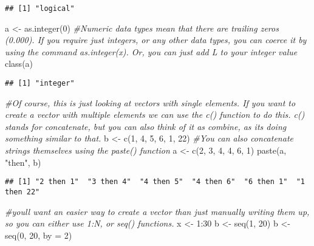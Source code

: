 \documentclass[
]{article}
\newenvironment{Shaded}{\begin{snugshade}}{\end{snugshade}}
\newcommand{\AttributeTok}[1]{\textcolor[rgb]{0.77,0.63,0.00}{#1}}
\newcommand{\CommentTok}[1]{\textcolor[rgb]{0.56,0.35,0.01}{\textit{#1}}}
\newcommand{\DecValTok}[1]{\textcolor[rgb]{0.00,0.00,0.81}{#1}}
\newcommand{\FunctionTok}[1]{\textcolor[rgb]{0.00,0.00,0.00}{#1}}
\newcommand{\NormalTok}[1]{#1}
\newcommand{\OtherTok}[1]{\textcolor[rgb]{0.56,0.35,0.01}{#1}}
\newcommand{\SpecialCharTok}[1]{\textcolor[rgb]{0.00,0.00,0.00}{#1}}
\newcommand{\StringTok}[1]{\textcolor[rgb]{0.31,0.60,0.02}{#1}}
\begin{document}
\begin{verbatim}
## [1] "logical"
\end{verbatim}

\begin{Shaded}
\begin{Highlighting}[]
\NormalTok{a }\OtherTok{\textless{}{-}} \FunctionTok{as.integer}\NormalTok{(}\DecValTok{0}\NormalTok{) }\CommentTok{\#Numeric data types mean that there are trailing zeros (0.000). If you require just integers, or any other data types, you can coerce it by using the command as.integer(x). Or, you can just add L to your integer value}
\FunctionTok{class}\NormalTok{(a)}
\end{Highlighting}
\end{Shaded}

\begin{verbatim}
## [1] "integer"
\end{verbatim}

\begin{Shaded}
\begin{Highlighting}[]
\CommentTok{\#Of course, this is just looking at vectors with single elements. If you want to create a vector with multiple elements we can use the c() function to do this. c() stands for concatenate, but you can also think of it as combine, as it\textquotesingle{}s doing something similar to that.}
\NormalTok{b }\OtherTok{\textless{}{-}} \FunctionTok{c}\NormalTok{(}\DecValTok{1}\NormalTok{, }\DecValTok{4}\NormalTok{, }\DecValTok{5}\NormalTok{, }\DecValTok{6}\NormalTok{, }\DecValTok{1}\NormalTok{, }\DecValTok{22}\NormalTok{)}
\CommentTok{\#You can also concatenate strings themselves using the paste() function}
\NormalTok{a }\OtherTok{\textless{}{-}} \FunctionTok{c}\NormalTok{(}\DecValTok{2}\NormalTok{, }\DecValTok{3}\NormalTok{, }\DecValTok{4}\NormalTok{, }\DecValTok{4}\NormalTok{, }\DecValTok{6}\NormalTok{, }\DecValTok{1}\NormalTok{)}
\FunctionTok{paste}\NormalTok{(a, }\StringTok{"then"}\NormalTok{, b)}
\end{Highlighting}
\end{Shaded}

\begin{verbatim}
## [1] "2 then 1"  "3 then 4"  "4 then 5"  "4 then 6"  "6 then 1"  "1 then 22"
\end{verbatim}

\begin{Shaded}
\begin{Highlighting}[]
\CommentTok{\#you\textquotesingle{}ll want an easier way to create a vector than just manually writing them up, so you can either use 1:N, or seq() functions.}
\NormalTok{x }\OtherTok{\textless{}{-}} \DecValTok{1}\SpecialCharTok{:}\DecValTok{30}
\NormalTok{b }\OtherTok{\textless{}{-}} \FunctionTok{seq}\NormalTok{(}\DecValTok{1}\NormalTok{, }\DecValTok{20}\NormalTok{)}
\NormalTok{b }\OtherTok{\textless{}{-}} \FunctionTok{seq}\NormalTok{(}\DecValTok{0}\NormalTok{, }\DecValTok{20}\NormalTok{, }\AttributeTok{by =} \DecValTok{2}\NormalTok{)}
\end{Highlighting}
\end{Shaded}
\end{document}
